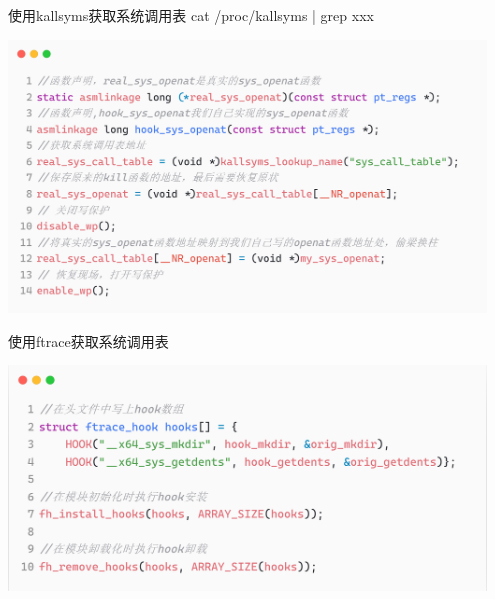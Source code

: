 \documentclass[11pt]{beamer}
\begin{document}
\begin{frame}{使用kallsyms获取系统调用表}
	cat /proc/kallsyms | grep xxx
	\begin{itemize}
		\centering
		\includegraphics[width=0.95\textwidth]{pic/kallsyms.png}
	\end{itemize}
\end{frame}

\begin{frame}{使用ftrace获取系统调用表}
	\begin{itemize}
		\centering
		\includegraphics[width=0.95\textwidth]{pic/ftrace.png}
	\end{itemize}
\end{frame}
\end{document}
